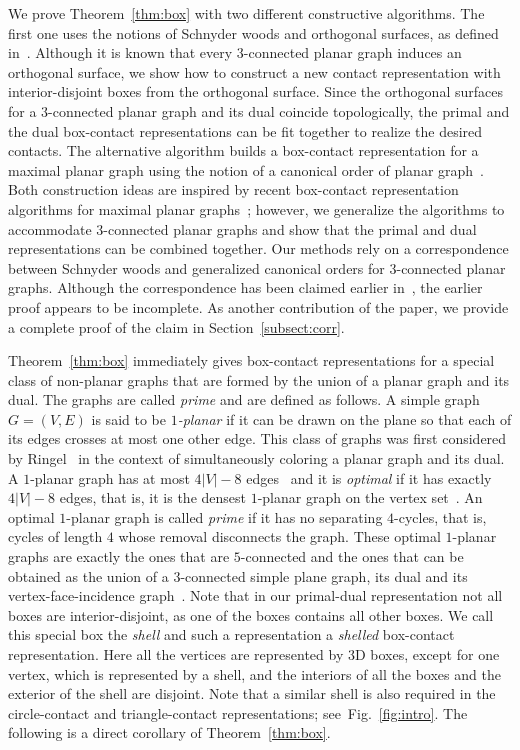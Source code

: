 \documentclass{article}
\newcommand{\df}{\textit}
\begin{document}
We prove Theorem~\ref{thm:box} with two different constructive algorithms. The first one
uses the notions of Schnyder woods and orthogonal surfaces, as defined in~\cite{FZ08}.
Although it is known that every $3$-connected planar graph induces an orthogonal surface, we show how to
construct a new contact representation with interior-disjoint boxes from the orthogonal surface.
Since the orthogonal surfaces for a $3$-connected planar graph and its dual coincide
topologically,
the primal and the dual box-contact representations can be fit together to realize the desired contacts.
The alternative algorithm
builds a box-contact representation for a maximal planar graph using the notion of a canonical order
 of planar graph~\cite{FPP90}. Both construction ideas are inspired by recent box-contact representation
 algorithms for maximal planar graphs~\cite{BEFHK+12}; however, we generalize the algorithms to
 accommodate $3$-connected planar graphs and show that the primal and dual representations can
 be combined together.
Our methods rely on a correspondence between Schnyder woods and generalized canonical orders for
 $3$-connected planar graphs. Although the correspondence has been claimed earlier in~\cite{BBC11},
 the earlier proof appears to be incomplete. As another contribution of the paper, we provide a complete
 proof of the claim in Section~\ref{subsect:corr}. 


Theorem~\ref{thm:box} immediately gives box-contact representations for a special class of
non-planar graphs that are formed by the union of a planar graph and its dual. The graphs are
called \df{prime} and are defined as follows. A simple graph $G=(V,E)$ is said to be \df{$1$-planar}
if it can be drawn on the plane so that each of its edges crosses at most one other edge.
This class of graphs was first considered by Ringel~\cite{Rin65} in the context of simultaneously coloring a planar graph and its dual. A $1$-planar graph has at most $4|V| - 8$ edges~\cite{FM07,PT97}
and it is \df{optimal} if it has exactly $4|V| - 8$ edges, that is, it is the
densest $1$-planar graph on the vertex set~\cite{BSW84,BEGGH+13}. An optimal
$1$-planar graph is called \df{prime} if it has no
separating $4$-cycles, that is, cycles of length $4$ whose removal disconnects the graph. These optimal $1$-planar
graphs are exactly the ones that are $5$-connected and the ones that can be obtained as the union of a $3$-connected
simple plane graph, its dual and its vertex-face-incidence graph~\cite{Sch86}.
Note that in our primal-dual representation not all boxes are interior-disjoint, as one of the boxes
contains all other boxes. We call this special box the \df{shell} and such a
representation a \df{shelled} box-contact representation. Here all the vertices are represented
by 3D boxes, except for one vertex, which is represented by a shell, and the interiors of all the
boxes and the exterior of the shell are disjoint. Note that a similar shell
is also required in the circle-contact and triangle-contact
representations; see~Fig.~\ref{fig:intro}. The following is a direct
corollary of Theorem~\ref{thm:box}.
\end{document}
